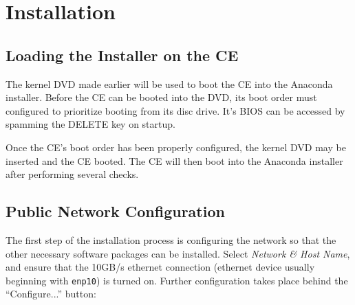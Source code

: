 \documentclass[12pt]{article}
\begin{document}


\section{Installation}

\subsection{Loading the Installer on the CE}

\qq The kernel DVD made earlier will be used to boot the CE into the Anaconda
installer. Before the CE can be booted into the DVD, its boot order must
configured to prioritize booting from its disc drive. It's BIOS can be accessed
by spamming the DELETE key on startup.

\qq Once the CE's boot order has been properly configured, the kernel DVD may be
inserted and the CE booted. The CE will then boot into the Anaconda installer
after performing several checks.

%
%

\subsection{Public Network Configuration}

\qq The first step of the installation process is configuring the network so
that the other necessary software packages can be installed. Select
\textit{Network \& Host Name}, and ensure that the 10GB/s ethernet connection
(ethernet device usually beginning with {\tt enp10}) is turned on. Further
configuration takes place behind the ``Configure...'' button:
\end{document}
